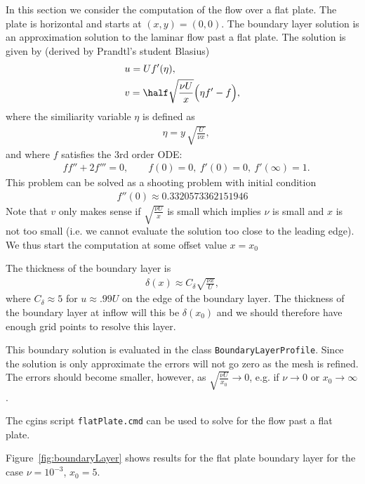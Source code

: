 \documentclass[10pt]{article}
\begin{document}
In this section we consider the computation of the flow over a flat plate.
The plate is horizontal and starts at $(x,y)=(0,0)$.
The boundary layer solution is an approximation solution to the laminar flow past a flat plate. The
solution  is given by (derived by Prandtl's student Blasius)
\begin{align*}
   & u = U f'(\eta), \\
   & v = \half \sqrt{\frac{\nu U}{x}} \Big( \eta f' - f \Big), 
\end{align*}
where the similiarity variable $\eta$ is defined as
\begin{align*}
   & \eta = y\, \sqrt{\frac{U}{\nu x}},
\end{align*}
and where $f$ satisfies the 3rd order ODE:
\begin{align*}
   & f f'' + 2 f ''' = 0, \qquad f(0)=0, ~ f'(0)=0, ~ f'(\infty)=1.
\end{align*}
This problem can be solved as a shooting problem with initial condition
\begin{align*}
   f''(0) \approx 0.3320573362151946
\end{align*}
Note that $v$ only makes sense if $\sqrt{\frac{\nu U}{x}}$ is small which implies $\nu$ is small
and $x$ is not too small (i.e. we cannot evaluate the solution too close to the leading edge). 
We thus start the computation at some offset value $x=x_0$

The thickness of the boundary layer is
\begin{align*}
   \delta(x) \approx C_\delta \sqrt{\frac{\nu x}{U}} , 
\end{align*}
where $C_\delta\approx 5$ for $u\approx .99 U$ on the edge of the boundary layer. 
The thickness of the boundary layer at inflow will this be $\delta(x_0)$ and we should therefore have
enough grid points to resolve this layer. 

This boundary solution is evaluated in the class {\tt BoundaryLayerProfile}.
Since the solution is only approximate the errors will not go zero as the mesh is refined.
The errors should become smaller, however, as $\sqrt{\frac{\nu U}{x_0}} \rightarrow 0$, e.g. 
if $\nu\rightarrow 0$ or $x_0\rightarrow\infty$. 


The cgins script {\tt flatPlate.cmd} can be used to solve for the flow past a flat plate.

Figure~\ref{fig:boundaryLayer} shows results for the flat plate boundary layer for the
case $\nu=10^{-3}$, $x_0=5$. 
\end{document}
